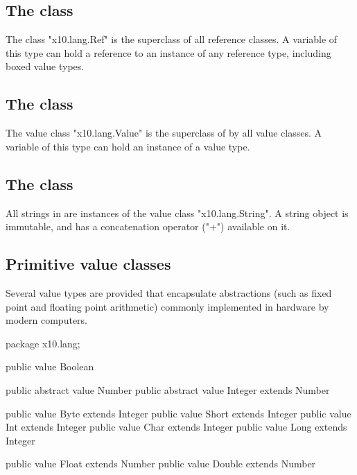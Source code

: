\subsection{The class }
\label{Ref}

The class \xcd"x10.lang.Ref" is the superclass of all reference
classes.  A variable of this type can hold a reference to an
instance of any reference type, including boxed value types.

\subsection{The class }
\label{Value}

The value class \xcd"x10.lang.Value" is the superclass of by all value
classes.
A variable of this type can hold an instance of a value type.

\subsection{The class }
\label{String}

All strings in \Xten{} are instances of the value class
\xcd"x10.lang.String".
A string object is immutable,
and has a concatenation operator (\xcd"+") available on it.

\subsection{Primitive value classes}

Several value types are provided that encapsulate
abstractions (such as fixed point and floating point arithmetic)
commonly implemented in hardware by modern computers.

\begin{xten}
package x10.lang;

public value Boolean { }

public abstract value Number { }
public abstract value Integer extends Number { }

public value Byte extends Integer  { }
public value Short extends Integer { }
public value Int extends Integer   { }
public value Char extends Integer  { }
public value Long extends Integer  { }

public value Float extends Number  { }
public value Double extends Number { }
\end{xten}

